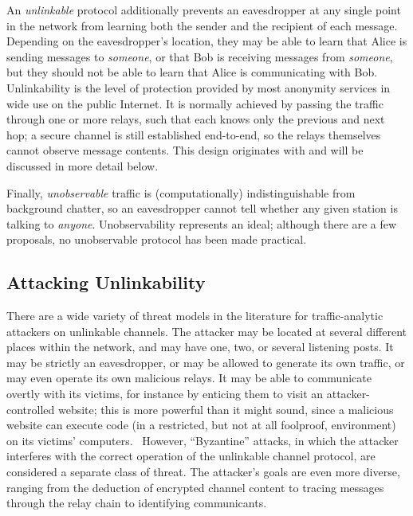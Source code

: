 An \emph{unlinkable} protocol additionally prevents an eavesdropper at
any single point in the network from learning both the sender and the
recipient of each message.  Depending on the eavesdropper's location,
they may be able to learn that Alice is sending messages to
\emph{someone}, or that Bob is receiving messages from \emph{someone},
but they should not be able to learn that Alice is communicating with
Bob.  Unlinkability is the level of protection provided by most
anonymity services in wide use on the public Internet.  It is normally
achieved by passing the traffic through one or more relays, such that
each knows only the previous and next hop; a secure channel is still
established end-to-end, so the relays themselves cannot observe
message contents.  This design originates with \textcite{chaum1981mix}
and will be discussed in more detail below.

Finally, \emph{unobservable} traffic is (computationally)
indistinguishable from background chatter, so an eavesdropper cannot tell
whether any given station is talking to \emph{anyone}.
Unobservability represents an ideal; although there are a few
proposals, no unobservable protocol has been made practical.

\subsection{Attacking Unlinkability}

There are a wide variety of threat models in the literature for
traffic-analytic attackers on unlinkable channels.  The attacker may
be located at several different places within the network, and may
have one, two, or several listening posts.  It may be strictly an
eavesdropper, or may be allowed to generate its own traffic, or may
even operate its own malicious relays.  It may be able to communicate
overtly with its victims, for instance by enticing them to visit an
attacker-controlled website; this is more powerful than it might
sound, since a malicious website can execute code (in a restricted,
but not at all foolproof, environment) on its victims'
computers.~\cite{barth2008securing} However, “Byzantine” attacks, in
which the attacker interferes with the correct operation of the
unlinkable channel protocol, are considered a separate class of
threat.  The attacker's goals are even more diverse, ranging from
the deduction of encrypted channel content to tracing messages through
the relay chain to identifying communicants. 

